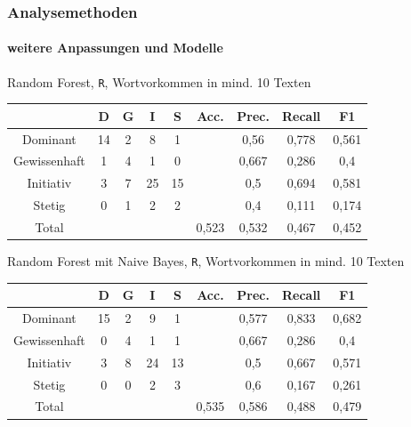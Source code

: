 \documentclass{beamer}
\begin{document}
\begin{frame}
 \frametitle{Analysemethoden}
 \framesubtitle{weitere Anpassungen und Modelle}
 
 Random Forest, \texttt{R}, Wortvorkommen in mind. 10 Texten
 \begin{center}
 \begin{tabular}{c|c|c|c|c|c|c|c|c|}
                & D     & G  & I    & S   & Acc.  & Prec. & Recall    & F1 \\
  \hline
  Dominant      & 14    & 2  & 8    & 1   &       & 0,56  & 0,778     & 0,561 \\
  Gewissenhaft  & 1     & 4  & 1    & 0   &       & 0,667 & 0,286     & 0,4 \\
  Initiativ     & 3     & 7  & 25   & 15  &       & 0,5   & 0,694     & 0,581\\
  Stetig        & 0     & 1  & 2    & 2   &       & 0,4   & 0,111     & 0,174\\
  \hline
  Total         &       &    &      &     & 0,523 & 0,532 & 0,467     & 0,452\\
  \hline
 \end{tabular}
 \end{center}
 
 \vspace{12pt}
 Random Forest mit Naive Bayes, \texttt{R}, Wortvorkommen in mind. 10 Texten
 \begin{center}
  \begin{tabular}{c|c|c|c|c|c|c|c|c|}
                & D     & G  & I    & S   & Acc.  & Prec. & Recall    & F1 \\
  \hline
  Dominant      & 15    & 2  & 9    & 1   &       & 0,577 & 0,833     & 0,682 \\
  Gewissenhaft  & 0     & 4  & 1    & 1   &       & 0,667 & 0,286     & 0,4 \\
  Initiativ     & 3     & 8  & 24   & 13  &       & 0,5   & 0,667     & 0,571\\
  Stetig        & 0     & 0  & 2    & 3   &       & 0,6   & 0,167     & 0,261\\
  \hline
  Total         &       &    &      &     & 0,535 & 0,586 & 0,488     & 0,479\\
  \hline
 \end{tabular}
 \end{center}
 
\end{frame}

\end{document}
